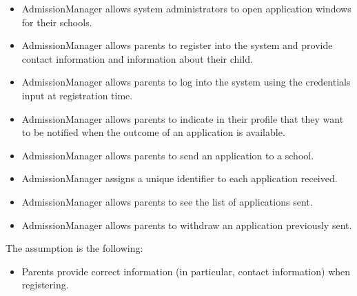 \documentclass[12pt, a4paper]{report}
\newtheorem[style=M,bodystyle=\normalfont]{theorem}{Theorem}
\newtheorem[style=M,bodystyle=\normalfont]{corollary}{Corollary}
\newtheorem[style=M,bodystyle=\normalfont]{lemma}{Lemma}
\newtheorem[style=M,bodystyle=\normalfont]{definition}{Definition}
\begin{document}
\begin{Answer}[ref=1]
\begin{enumerate}
                \begin{itemize}
                    \item AdmissionManager allows system administrators to open application windows for their schools.
                    \item AdmissionManager allows parents to register into the system and provide contact information and information about their child. 
                    \item AdmissionManager allows parents to log into the system using the credentials input at registration time.
                    \item AdmissionManager allows parents to indicate in their profile that they want to be notified when the outcome of an application is available. 
                    \item AdmissionManager allows parents to send an application to a school. 
                    \item AdmissionManager assigns a unique identifier to each application received. 
                    \item AdmissionManager allows parents to see the list of applications sent.
                    \item AdmissionManager allows parents to withdraw an application previously sent.
                \end{itemize}
                The assumption is the following: 
                \begin{itemize}
                    \item Parents provide correct information (in particular, contact information) when registering.
                \end{itemize}


\end{enumerate}
\end{Answer}
\end{document}
